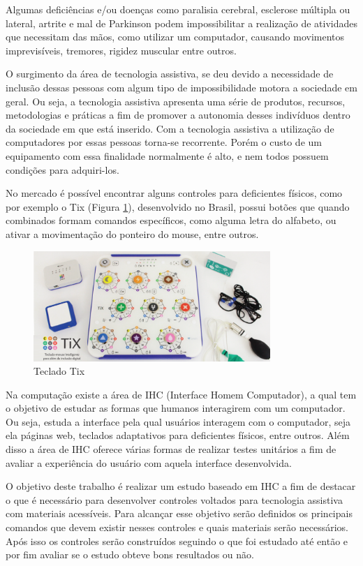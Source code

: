 \documentclass[
	12pt,			%
	openright,		%
	oneside,			%
	a4paper,			%
	chapter=TITLE,		%
	english,			%
	brazil,			%
	]{abntex2}
\begin{document}
Algumas deficiências e/ou doenças como paralisia cerebral, esclerose múltipla ou lateral, artrite e mal de Parkinson podem impossibilitar a realização de atividades que necessitam das mãos, como utilizar um computador, causando movimentos imprevisíveis, tremores, rigidez muscular entre outros.

O surgimento da área de tecnologia assistiva, se deu devido a necessidade de inclusão dessas pessoas com algum tipo de impossibilidade motora a sociedade em geral. Ou seja, a tecnologia assistiva apresenta uma série de produtos, recursos, metodologias e práticas a fim de promover a autonomia desses indivíduos dentro da sociedade em que está inserido. Com a tecnologia assistiva a utilização de computadores por essas pessoas torna-se recorrente. Porém o custo de um equipamento com essa finalidade normalmente é alto, e nem todos possuem condições para adquiri-los.

No mercado é possível encontrar alguns controles para deficientes físicos, como por exemplo o Tix (Figura \ref{img:img-14-2}), desenvolvido no Brasil, possui botões que quando combinados formam comandos específicos, como alguma letra do alfabeto, ou ativar a movimentação do ponteiro do mouse, entre outros.

\begin{figure}[H]
\centering
		\includegraphics[width=0.8\textwidth]{./img/img-14.png}
		\caption{Teclado Tix}
		\label{img:img-14-2}
\end{figure}

Na computação existe a área de IHC (Interface Homem Computador), a qual tem o objetivo de estudar as formas que humanos interagirem com um computador. Ou seja, estuda a interface pela qual usuários interagem com o computador, seja ela páginas web, teclados adaptativos para deficientes físicos, entre outros. Além disso a área de IHC oferece várias formas de realizar testes unitários a fim de avaliar a experiência do usuário com aquela interface desenvolvida.

O objetivo deste trabalho é realizar um estudo baseado em IHC a fim de destacar o que é necessário para desenvolver controles voltados para tecnologia assistiva com materiais acessíveis. Para alcançar esse objetivo serão definidos os principais comandos que devem existir nesses controles e quais materiais serão necessários. Após isso os controles serão construídos seguindo o que foi estudado até então e por fim avaliar se o estudo obteve bons resultados ou não.
\end{document}
